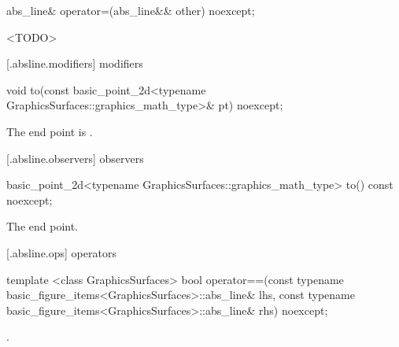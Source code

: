 %
\begin{itemdecl}
abs_line& operator=(abs_line&& other) noexcept;
\end{itemdecl}
\begin{itemdescr}
\pnum
\effects
<TODO>

\pnum
\returns
{}
\end{itemdescr}

 [\iotwod.absline.modifiers]{ modifiers}

%
\begin{itemdecl}
void to(const basic_point_2d<typename GraphicsSurfaces::graphics_math_type>& pt) noexcept;
\end{itemdecl}
\begin{itemdescr}
\pnum
\effects
The end point is .
\end{itemdescr}

 [\iotwod.absline.observers]{ observers}

%
\begin{itemdecl}
basic_point_2d<typename GraphicsSurfaces::graphics_math_type> to() const noexcept;
\end{itemdecl}
\begin{itemdescr}
\pnum
\returns
The end point.
\end{itemdescr}

 [\iotwod.absline.ops]{ operators}

%
\begin{itemdecl}
template <class GraphicsSurfaces>
bool operator==(const typename basic_figure_items<GraphicsSurfaces>::abs_line& lhs,
  const typename basic_figure_items<GraphicsSurfaces>::abs_line& rhs) noexcept;
\end{itemdecl}
\begin{itemdescr}
\pnum
\returns
{}.
\end{itemdescr}
